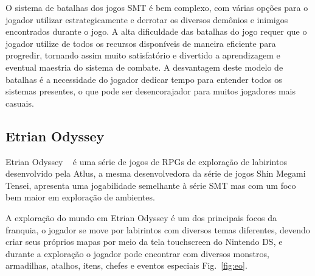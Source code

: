 \documentclass[
	12pt,				%
	openright,			%
	twoside,			%
	a4paper,			%
	english,			%
	french,				%
	spanish,			%
	brazil				%
	]{abntex2}
\begin{document}
O sistema de batalhas dos jogos SMT é bem complexo, com várias opções para o jogador utilizar estrategicamente e derrotar os diversos demônios e inimigos encontrados durante o jogo. A alta dificuldade das batalhas do jogo requer que o jogador utilize de todos os recursos disponíveis de maneira eficiente para progredir, tornando assim muito satisfatório e divertido a aprendizagem e eventual maestria do sistema de combate. A desvantagem deste modelo de batalhas é a necessidade do jogador dedicar tempo para entender todos os sistemas presentes, o que pode ser desencorajador para muitos jogadores mais casuais.

\subsection{Etrian Odyssey}

Etrian Odyssey ~\cite{EOW} é uma série de jogos de RPGs de exploração de labirintos desenvolvido pela Atlus, a mesma desenvolvedora da série de jogos Shin Megami Tensei, apresenta uma jogabilidade semelhante à série SMT mas com um foco bem maior em exploração de ambientes.

	A exploração do mundo em Etrian Odyssey é um dos principais focos da franquia, o jogador se move por labirintos com diversos temas diferentes, devendo criar seus próprios mapas por meio da tela touchscreen do Nintendo DS, e durante a exploração o jogador pode encontrar com diversos monstros, armadilhas, atalhos, itens, chefes e eventos especiais Fig.~\ref{fig:eo}.
\end{document}
